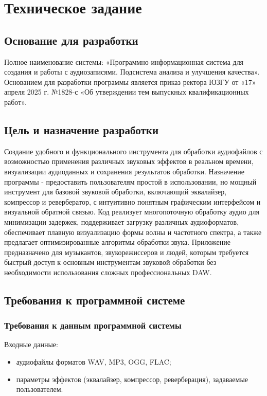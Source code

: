 \section{Техническое задание}
\subsection{Основание для разработки}

Полное наименование системы: «Программно-информационная система для создания и работы с аудиозаписями. Подсистема анализа и улучшения качества». Основанием для разработки программы является приказ ректора ЮЗГУ от «17» апреля 2025 г. №1828-с «Об утверждении тем выпускных квалификационных работ».

\subsection{Цель и назначение разработки}

Создание удобного и функционального инструмента для обработки аудиофайлов с возможностью применения различных звуковых эффектов в реальном времени, визуализации аудиоданных и сохранения результатов обработки. Назначение программы - предоставить пользователям простой в использовании, но мощный инструмент для базовой звуковой обработки, включающий эквалайзер, компрессор и ревербератор, с интуитивно понятным графическим интерфейсом и визуальной обратной связью. Код реализует многопоточную обработку аудио для минимизации задержек, поддерживает загрузку различных аудиоформатов, обеспечивает плавную визуализацию формы волны и частотного спектра, а также предлагает оптимизированные алгоритмы обработки звука. Приложение предназначено для музыкантов, звукорежиссеров и людей, которым требуется быстрый доступ к основным инструментам звуковой обработки без необходимости использования сложных профессиональных DAW.

\subsection{Требования к программной системе}

\subsubsection{Требования к данным программной системы}

Входные данные:
\begin{itemize}
	\item аудиофайлы форматов WAV, MP3, OGG, FLAC;
	\item параметры эффектов (эквалайзер, компрессор, реверберация), задаваемые пользователем.
\end{itemize}

